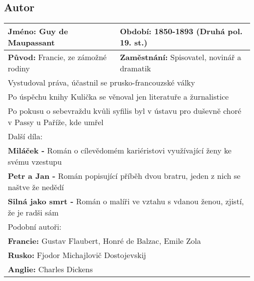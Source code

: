 \subsection*{Autor}
\begin{tabularx}{\linewidth}{l|l}
  \textbf{Jméno:} Guy de Maupassant          & \textbf{Období:} 1850-1893 (Druhá pol. 19. st.)                        \\
  \hline
  \textbf{Původ:} Francie, ze zámožné rodiny & \textbf{Zaměstnání:} Spisovatel, novinář a dramatik                    \\
  \hline
  \multicolumn{2}{l}{Vystudoval práva, účastnil se prusko-francouzské války}                                          \\
  \multicolumn{2}{l}{Po úspěchu knihy Kulička se věnoval jen literatuře a žurnalistice}                               \\
  \multicolumn{2}{l}{Po pokusu o sebevraždu kvůli syfilis byl v ústavu pro duševně choré v Passy u Paříže, kde umřel} \\
  \hline
  \multicolumn{2}{l}{Další díla:}                                                                                     \\
  \multicolumn{2}{l}{\textbf{Miláček -} Román o cílevědomém kariéristovi využívající ženy ke svému vzestupu}          \\
  \multicolumn{2}{l}{\textbf{Petr a Jan -} Román popisující příběh dvou bratru, jeden z nich se naštve že nedědí}     \\
  \multicolumn{2}{l}{\textbf{Silná jako smrt -} Román o malíři ve vztahu s vdanou ženou, zjistí, že je radši sám}     \\
  \hline
  \multicolumn{2}{l}{Podobní autoři:}                                                                                 \\
  \multicolumn{2}{l}{\textbf{Francie:} Gustav Flaubert, Honré de Balzac, Emile Zola}                                  \\
  \multicolumn{2}{l}{\textbf{Rusko:} Fjodor Michajlovič Dostojevskij}                                                 \\
  \multicolumn{2}{l}{\textbf{Anglie:} Charles Dickens}                                                                \\
\end{tabularx}